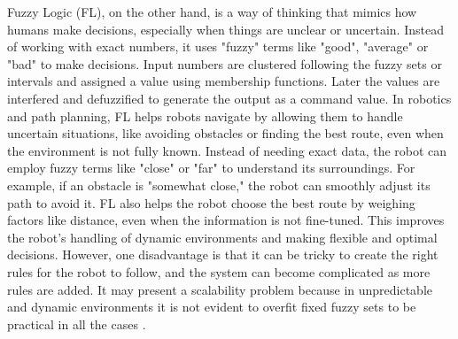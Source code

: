 Fuzzy Logic (FL), on the other hand, is a way of thinking that mimics how humans make decisions, especially when things are unclear 
or uncertain. Instead of working with exact numbers, it uses "fuzzy" terms like "good", "average" or "bad" to make 
decisions. Input numbers are clustered following the fuzzy sets or intervals and assigned a value using membership 
functions. Later the values are interfered and defuzzified to generate the output as a command value. 
In robotics and path planning, FL helps robots navigate by allowing them to handle uncertain situations, 
like avoiding obstacles or finding the best route, even when the environment is not fully known. Instead of needing 
exact data, the robot can employ fuzzy terms like "close" or "far" to understand its surroundings. For example, if an 
obstacle is "somewhat close," the robot can smoothly adjust its path to avoid it. FL also helps the robot choose the best 
route by weighing factors like distance, even when the information is not fine-tuned. This improves the 
robot's handling of dynamic environments and making flexible and optimal decisions.
However, one 
disadvantage is that it can be tricky to create the right rules for the robot to follow, and the system can become 
complicated as more rules are added. It may present a scalability problem because in unpredictable and dynamic environments
it is not evident to overfit fixed fuzzy sets to be practical in all the cases \cite{R12}.

